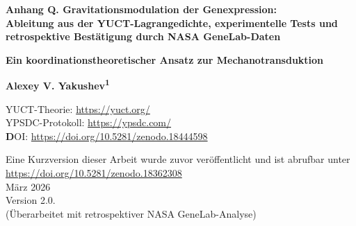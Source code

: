 \documentclass[12pt,a4paper]{article}
\theoremstyle{remark}
\begin{document}
	
	\begin{titlepage}
		\begin{center}
			\vspace*{1cm}
			
			\Huge\textbf{Anhang Q. Gravitationsmodulation der Genexpression: \\ Ableitung aus der YUCT-Lagrangedichte, experimentelle Tests und retrospektive Bestätigung durch NASA GeneLab-Daten}
			
			\vspace{0.5cm}
			\Large\textbf{Ein koordinationstheoretischer Ansatz zur Mechanotransduktion}
			
			\vspace{1.5cm}
			
			\Large\textbf{Alexey V. Yakushev\textsuperscript{1}}
			
			YUCT-Theorie: \url{https://yuct.org/}\\
			YPSDC-Protokoll: \url{https://ypsdc.com/}\\
			
			\vspace{2cm}
			\textbf DOI: \url{https://doi.org/10.5281/zenodo.18444598}\\
			
			\vspace{1cm}
			
			\vspace{0cm}
			\large 
			Eine Kurzversion dieser Arbeit wurde zuvor veröffentlicht und ist abrufbar unter\\ \url{https://doi.org/10.5281/zenodo.18362308}\\
			\vspace{1cm}
			März 2026 \\ \large Version 2.0.
			\\ (Überarbeitet mit retrospektiver NASA GeneLab-Analyse)
			
			\vspace{2cm}
			

\end{center}
\end{titlepage}
\end{document}
